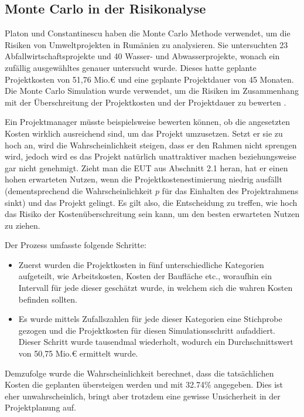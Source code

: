 \subsection{Monte Carlo in der Risikonalyse}

Platon und Constantinescu haben die Monte Carlo Methode verwendet, um die Risiken von Umweltprojekten in Rumänien zu analysieren. Sie untersuchten 23 Abfallwirtschaftsprojekte und 40 Wasser- und Abwasserprojekte, wonach ein zufällig ausgewähltes genauer untersucht wurde. Dieses hatte geplante Projektkosten von 51,76 Mio.€ und eine geplante Projektdauer von 45 Monaten. Die Monte Carlo Simulation wurde verwendet, um die Risiken im Zusammenhang mit der Überschreitung der Projektkosten und der Projektdauer zu bewerten \cite{Platon2014}.

Ein Projektmanager müsste beispielsweise bewerten können, ob die angesetzten Kosten wirklich ausreichend sind, um das Projekt umzusetzen. Setzt er sie zu hoch an, wird die Wahrscheinlichkeit steigen, dass er den Rahmen nicht sprengen wird, jedoch wird es das Projekt natürlich unattraktiver machen beziehungsweise gar nicht genehmigt. Zieht man die EUT aus Abschnitt 2.1 heran, hat er einen hohen erwarteten Nutzen, wenn die Projektkostenestimierung niedrig ausfällt (dementsprechend die Wahrscheinlichkeit \( p \) für das Einhalten des Projektrahmens sinkt) und das Projekt gelingt. Es gilt also, die Entscheidung zu treffen, wie hoch das Risiko der Kostenüberschreitung sein kann, um den besten erwarteten Nutzen zu ziehen.

Der Prozess umfasste folgende Schritte:

\begin{itemize}
    \item Zuerst wurden die Projektkosten in fünf unterschiedliche Kategorien aufgeteilt, wie Arbeitskosten, Kosten der Baufläche etc., woraufhin ein Intervall für jede dieser geschätzt wurde, in welchem sich die wahren Kosten befinden sollten.
    \item Es wurde mittels Zufallszahlen für jede dieser Kategorien eine Stichprobe gezogen und die Projektkosten für diesen Simulationsschritt aufaddiert. Dieser Schritt wurde tausendmal wiederholt, wodurch ein Durchschnittswert von 50,75 Mio.€ ermittelt wurde.
\end{itemize}

Demzufolge wurde die Wahrscheinlichkeit berechnet, dass die tatsächlichen Kosten die geplanten übersteigen werden und mit 32.74\% angegeben. Dies ist eher unwahrscheinlich, bringt aber trotzdem eine gewisse Unsicherheit in der Projektplanung auf.

